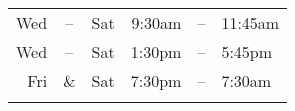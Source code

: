 \begin{center}
  \begin{tabular}{rclrcl}
    \\ \hline
    Wed & -- & Sat & 9:30am & -- & 11:45am \\
    Wed & -- & Sat & 1:30pm & -- & 5:45pm \\
    Fri & \& & Sat & 7:30pm & -- & 7:30am \\
    \hline \\
  \end{tabular}
\end{center}
